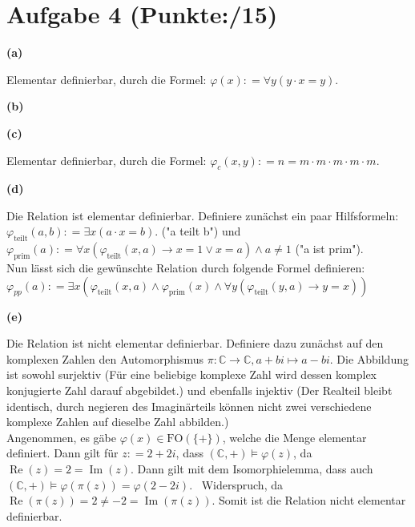 \documentclass[11pt, a4paper]{article}
\newcommand{\ppp}{15}
\newcommand{\defgr}{\mathrel{\mathop:\!\!=}}
\begin{document}
\section*{Aufgabe 4 (Punkte:\qquad/\ppp)}
\textbf{(a)}
\begin{adjustwidth}{20pt}{20pt}
	Elementar definierbar, durch die Formel: $\varphi(x) \defgr \forall y(y \cdot x = y)$.
\end{adjustwidth}
\textbf{(b)}
\begin{adjustwidth}{20pt}{20pt}

\end{adjustwidth}
\textbf{(c)}
\begin{adjustwidth}{20pt}{20pt}
	Elementar definierbar, durch die Formel: $\varphi_c(x,y) \defgr n = m \cdot m \cdot m \cdot m \cdot m$.
\end{adjustwidth}
\textbf{(d)}
\begin{adjustwidth}{20pt}{20pt}
	Die Relation ist elementar definierbar. Definiere zunächst ein paar Hilfsformeln:\\
	$\varphi_{\text{teilt}}(a,b) \defgr \exists x(a \cdot x = b)$. ("a teilt b") und\\
	$\varphi_{\text{prim}}(a) \defgr \forall x(\varphi_{\text{teilt}}(x,a) \rightarrow x=1 \vee x=a) \wedge a\neq 1$ ("a ist prim").\\
	Nun lässt sich die gewünschte Relation durch folgende Formel definieren:\\
	$\varphi_{pp}(a) \defgr \exists x(\varphi_{\text{teilt}}(x,a) \wedge \varphi_{\text{prim}}(x) \wedge \forall y(\varphi_{\text{teilt}}(y,a) \rightarrow y=x))$
\end{adjustwidth}
\textbf{(e)}
\begin{adjustwidth}{20pt}{20pt}
	Die Relation ist nicht elementar definierbar. Definiere dazu zunächst auf den komplexen Zahlen den Automorphismus $\pi:\mathbb{C} \to \mathbb{C}, a+bi \mapsto a-bi$. Die Abbildung
	ist sowohl surjektiv (Für eine beliebige komplexe Zahl wird dessen komplex konjugierte Zahl darauf abgebildet.) und ebenfalls injektiv (Der Realteil bleibt identisch, durch negieren des
	Imaginärteils können nicht zwei verschiedene komplexe Zahlen auf dieselbe Zahl abbilden.)\\
	Angenommen, es gäbe $\varphi(x) \in \text{FO}(\{ +\})$, welche die Menge elementar definiert. Dann gilt für $z \defgr 2+2i$, dass $(\mathbb{C},+) \models \varphi(z)$, da
	$\operatorname{Re}(z)=2=\operatorname{Im}(z)$. Dann gilt mit dem Isomorphielemma, dass auch $(\mathbb{C},+) \models \varphi(\pi(z))=\varphi(2-2i)$. \Lightning\ Widerspruch, da
	$\operatorname{Re}(\pi(z))=2\neq -2=\operatorname{Im}(\pi(z))$. Somit ist die Relation nicht elementar definierbar.
\end{adjustwidth}
\end{document}
